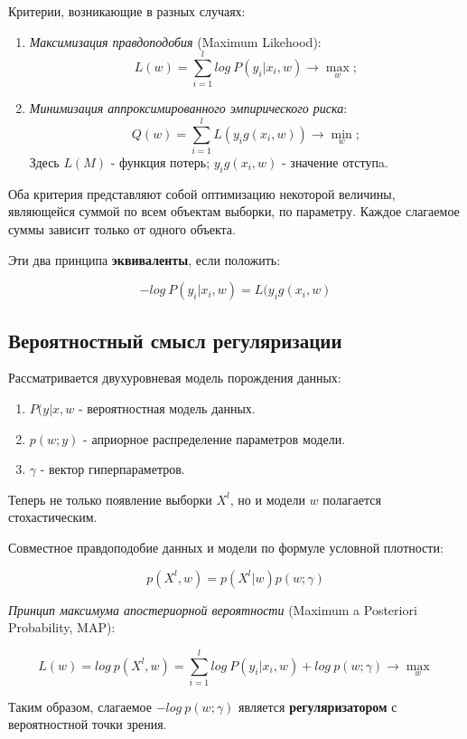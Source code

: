 Критерии, возникающие в разных случаях:
\begin{enumerate}

    \item \textit{Максимизация правдоподобия} (Maximum Likehood):
    \[
    L(w) = \sum_{i=1}^{l}{log \ P(y_{i}|x_{i},w)} \xrightarrow{} \max_{w};
    \]

    \item \textit{Минимизация аппроксимированного эмпирического риска}:
    \[
    Q(w) = \sum_{i=1}^{l}{L(y_{i}g(x_{i},w))} \xrightarrow{} \min_{w};
    \]
    Здесь \(L(M)\) - функция потерь; \(y_{i}g(x_{i}, w)\) - значение отступa.

\end{enumerate}


Оба критерия представляют собой оптимизацию некоторой величины, являющейся суммой по всем объектам выборки, по параметру. Каждое слагаемое суммы зависит только от одного объекта.

Эти два принципа \textbf{эквиваленты}, если положить:

\[
-log \ P(y_{i}|x_{i},w) = L(y_{i}g(x_{i},w)
\]

\subsection{Вероятностный смысл регуляризации}

Рассматривается двухуровневая модель порождения данных:
\begin{enumerate}
    \item \(P(y|x,w\) - вероятностная модель данных.
    \item \(p(w;y)\) - априорное распределение параметров модели.
    \item \(\gamma\) - вектор гиперпараметров.
\end{enumerate}

Теперь не только появление выборки \(X^{l}\), но и модели \(w\) полагается стохастическим.

Совместное правдоподобие данных и модели по формуле условной плотности:

\[
p(X^{l},w) = p(X^{l}|w)p(w;\gamma)
\]

\textit{Принцип максимума апостериорной вероятности} (Maximum a Posteriori Probability, MAP):

\[
L(w) = log \ p(X^{l},w) = \sum_{i=1}^{l}{log \ P(y_{i}|x_{i},w) + log \ p(w;\gamma)} \xrightarrow{} \max_{w}
\]

Таким образом, слагаемое \(-log \ p(w;\gamma)\) является \textbf{регуляризатором} с вероятностной точки зрения.


